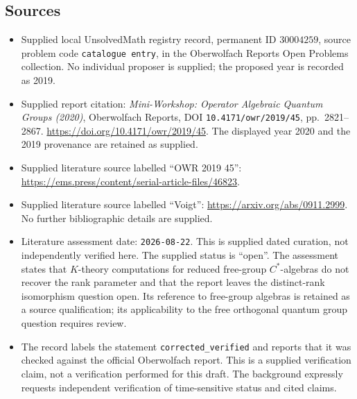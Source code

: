 \documentclass[11pt]{article}
\begin{document}
\subsection{Sources}
\begin{itemize}
\item Supplied local UnsolvedMath registry record, permanent ID \(30004259\), source problem code \texttt{catalogue entry}, in the Oberwolfach Reports Open Problems collection. No individual proposer is supplied; the proposed year is recorded as 2019.
\item Supplied report citation: \emph{Mini-Workshop: Operator Algebraic Quantum Groups (2020)}, Oberwolfach Reports, DOI \texttt{10.4171/owr/2019/45}, pp.~2821--2867. \url{https://doi.org/10.4171/owr/2019/45}. The displayed year 2020 and the 2019 provenance are retained as supplied.
\item Supplied literature source labelled ``OWR 2019 45'': \url{https://ems.press/content/serial-article-files/46823}.
\item Supplied literature source labelled ``Voigt'': \url{https://arxiv.org/abs/0911.2999}. No further bibliographic details are supplied.
\item Literature assessment date: \texttt{2026-08-22}. This is supplied dated curation, not independently verified here. The supplied status is ``open''. The assessment states that \(K\)-theory computations for reduced free-group \(C^*\)-algebras do not recover the rank parameter and that the report leaves the distinct-rank isomorphism question open. Its reference to free-group algebras is retained as a source qualification; its applicability to the free orthogonal quantum group question requires review.
\item The record labels the statement \texttt{corrected\_verified} and reports that it was checked against the official Oberwolfach report. This is a supplied verification claim, not a verification performed for this draft. The background expressly requests independent verification of time-sensitive status and cited claims.
\end{itemize}
\end{document}
